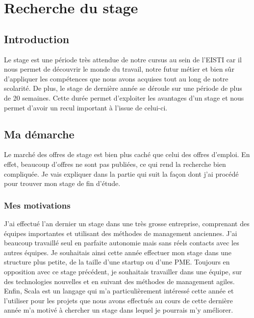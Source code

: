 
\chapter{Recherche du stage} %

\label{presentation} %



\section{Introduction}

Le stage est une période très attendue de notre cursus au sein de l’EISTI car il nous permet de découvrir le monde du travail, notre futur métier et bien sûr d’appliquer les compétences que nous avons acquises tout au long de notre scolarité.
De plus, le stage de dernière année se déroule sur une période de plus de 20 semaines.
Cette durée permet d'exploiter les avantages d’un stage et nous permet d’avoir un recul important à l’issue de celui-ci.


\section{Ma démarche}
Le marché des offres de stage est bien plus caché que celui des offres d'emploi.
En effet, beaucoup d'offres ne sont pas publiées, ce qui rend la recherche bien compliquée.
Je vais expliquer dans la partie qui suit la façon dont j'ai procédé pour trouver mon stage de fin d'étude.

\subsection{Mes motivations}
J'ai effectué l'an dernier un stage dans une très grosse entreprise, comprenant des équipes importantes et utilisant des méthodes de management anciennes.
J'ai beaucoup travaillé seul en parfaite autonomie mais sans réels contacts avec les autres équipes.
Je souhaitais ainsi cette année effectuer mon stage dans une structure plus petite, de la taille d'une startup ou d'une PME.
Toujours en opposition avec ce stage précédent, je souhaitais travailler dans une équipe, sur des technologies nouvelles et en suivant des méthodes de management agiles.
Enfin, Scala est un langage qui m'a particulièrement intéressé cette année et l'utiliser pour les projets que nous avons effectués au cours de cette dernière année m'a motivé à chercher un stage dans lequel je pourrais m'y améliorer.

